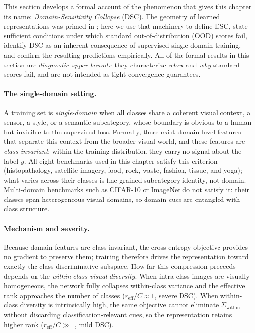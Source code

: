 This section develops a formal account of the phenomenon that gives this chapter its name: \emph{Domain-Sensitivity Collapse} (DSC). The geometry of learned representations was primed in ; here we use that machinery to define DSC, state sufficient conditions under which standard out-of-distribution (OOD) scores fail, identify DSC as an inherent consequence of supervised single-domain training, and confirm the resulting predictions empirically. All of the formal results in this section are \emph{diagnostic upper bounds}: they characterize \emph{when} and \emph{why} standard scores fail, and are not intended as tight convergence guarantees.

\paragraph{The single-domain setting.}
A training set is \emph{single-domain} when all classes share a coherent visual context, a sensor, a style, or a semantic subcategory, whose boundary is obvious to a human but invisible to the supervised loss. Formally, there exist domain-level features that separate this context from the broader visual world, and these features are \emph{class-invariant}: within the training distribution they carry no signal about the label $y$. All eight benchmarks used in this chapter satisfy this criterion (histopathology, satellite imagery, food, rock, waste, fashion, tissue, and yoga); what varies across their classes is fine-grained subcategory identity, not domain. Multi-domain benchmarks such as CIFAR-10 or ImageNet do not satisfy it: their classes span heterogeneous visual domains, so domain cues are entangled with class structure.

\paragraph{Mechanism and severity.}
Because domain features are class-invariant, the cross-entropy objective provides no gradient to preserve them; training therefore drives the representation toward exactly the class-discriminative subspace. How far this compression proceeds depends on the \emph{within-class visual diversity}. When intra-class images are visually homogeneous, the network fully collapses within-class variance and the effective rank approaches the number of classes ($r_{\mathrm{eff}}/C \approx 1$, severe DSC). When within-class diversity is intrinsically high, the same objective cannot eliminate $\Sigma_{\mathrm{within}}$ without discarding classification-relevant cues, so the representation retains higher rank ($r_{\mathrm{eff}}/C \gg 1$, mild DSC).

